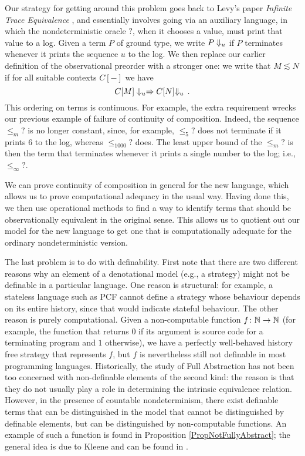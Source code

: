 Our strategy for getting around this problem goes back to Levy's paper \emph{Infinite Trace Equivalence} \cite{LevyGsInfinite}, and essentially involves going via an auxiliary language, in which the nondeterministic oracle $?$, when it chooses a value, must print that value to a log.  
Given a term $P$ of ground type, we write $P\Downarrow_u$ if $P$ terminates whenever it prints the sequence $u$ to the log.  
We then replace our earlier definition of the observational preorder with a stronger one: we write that $M\lesssim N$ if for all suitable contexts $C[-]$ we have
\[
  C[M] \Downarrow_u \mathrel{\Rightarrow C[N]} \Downarrow_u\,.
  \]
This ordering on terms is continuous.
For example, the extra requirement wrecks our previous example of failure of continuity of composition.  
Indeed, the sequence $\le_m ?$ is no longer constant, since, for example, $\le_5 ?$ does not terminate if it prints $6$ to the log, whereas $\le_{1000} ?$ does.
The least upper bound of the $\le_m?$ is then the term that terminates whenever it prints a single number to the log; i.e., $\le_\infty ?$.

We can prove continuity of composition in general for the new language, which allows us to prove computational adequacy in the usual way.
Having done this, we then use operational methods to find a way to identify terms that should be observationally equivalent in the original sense.  
This allows us to quotient out our model for the new language to get one that is computationally adequate for the ordinary nondeterministic version.

The last problem is to do with definability.
First note that there are two different reasons why an element of a denotational model (e.g., a strategy) might not be definable in a particular language.  
One reason is structural: for example, a stateless language such as PCF cannot define a strategy whose behaviour depends on its entire history, since that would indicate stateful behaviour.  
The other reason is purely computational.  
Given a non-computable function $f\colon \mathbb{N} \to \mathbb{N}$ (for example, the function that returns $0$ if its argument is source code for a terminating program and $1$ otherwise), we have a perfectly well-behaved history free strategy that represents $f$, but $f$ is nevertheless still not definable in most programming languages.  
Historically, the study of Full Abstraction has not been too concerned with non-definable elements of the second kind: the reason is that they do not usually play a role in determining the intrinsic equivalence relation.
However, in the presence of countable nondeterminism, there exist definable terms that can be distinguished in the model that cannot be distinguished by definable elements, but can be distinguished by non-computable functions.
An example of such a function is found in Proposition \ref{PropNotFullyAbstract}; the general idea is due to Kleene and can be found in \cite{KleeneTree}.

